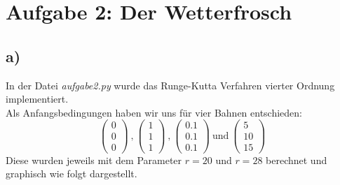 \newpage
\section{Aufgabe 2: Der Wetterfrosch}
\label{sec:auf2}

\subsection{a)}
In der Datei \textit{aufgabe2.py} wurde das Runge-Kutta Verfahren vierter Ordnung implementiert.\\
Als Anfangsbedingungen haben wir uns für vier Bahnen entschieden:
\begin{equation}
    \left(\begin{array}{c}0\\0\\0\end{array}\right) \ \text{,} \ \left(\begin{array}{c}1\\1\\1\end{array}\right) \ \text{,} \ \left(\begin{array}{c}0.1\\0.1\\0.1\end{array}\right) \ \text{und} \ \left(\begin{array}{c}5\\10\\15\end{array}\right)
\end{equation}
Diese wurden jeweils mit dem Parameter $r=20$ und $r=28$ berechnet und graphisch wie folgt dargestellt.

